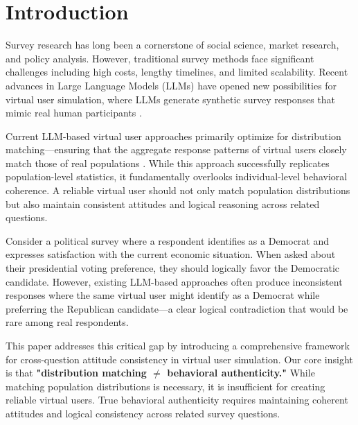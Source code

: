 \documentclass[sigconf, anonymous]{acmart}
\begin{document}

\maketitle

\section{Introduction}

Survey research has long been a cornerstone of social science, market research, and policy analysis. However, traditional survey methods face significant challenges including high costs, lengthy timelines, and limited scalability. Recent advances in Large Language Models (LLMs) have opened new possibilities for virtual user simulation, where LLMs generate synthetic survey responses that mimic real human participants \cite{park2023generative, chen2025polypersona, wang2025large}.

Current LLM-based virtual user approaches primarily optimize for distribution matching—ensuring that the aggregate response patterns of virtual users closely match those of real populations \cite{zhang2025llm, liu2025alignsurvey}. While this approach successfully replicates population-level statistics, it fundamentally overlooks individual-level behavioral coherence. A reliable virtual user should not only match population distributions but also maintain consistent attitudes and logical reasoning across related questions.

Consider a political survey where a respondent identifies as a Democrat and expresses satisfaction with the current economic situation. When asked about their presidential voting preference, they should logically favor the Democratic candidate. However, existing LLM-based approaches often produce inconsistent responses where the same virtual user might identify as a Democrat while preferring the Republican candidate—a clear logical contradiction that would be rare among real respondents.

This paper addresses this critical gap by introducing a comprehensive framework for cross-question attitude consistency in virtual user simulation. Our core insight is that \textbf{"distribution matching $\neq$ behavioral authenticity."} While matching population distributions is necessary, it is insufficient for creating reliable virtual users. True behavioral authenticity requires maintaining coherent attitudes and logical consistency across related survey questions.
\end{document}
